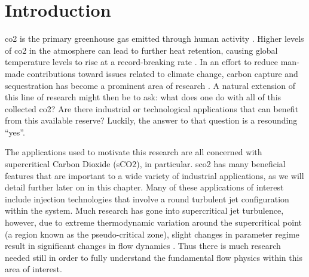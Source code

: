 \chapter{Introduction}

\gls{co2} is the primary greenhouse gas emitted through human activity \cite{Emissions_2023}. Higher levels of \gls{co2} in the atmosphere can lead to further heat retention, causing global temperature levels to rise at a record-breaking rate \cite{Lindsey_2023,}. In an effort to reduce man-made contributions toward issues related to climate change, carbon capture and sequestration has become a prominent area of research \cite{}. A natural extension of this line of research might then be to ask: what does one do with all of this collected \gls{co2}? Are there industrial or technological applications that can benefit from this available reserve? Luckily, the answer to that question is a resounding ``yes''.


The applications used to motivate this research are all concerned with supercritical Carbon Dioxide (sCO2), in particular. \gls{sco2} has many beneficial features that are important to a wide variety of industrial applications, as we will detail further later on in this chapter. Many of these applications of interest include injection technologies that involve a round turbulent jet configuration within the system. Much research has gone into supercritical jet turbulence, however, due to extreme thermodynamic variation around the supercritical point (a region known as the pseudo-critical zone), slight changes in parameter regime result in significant changes in flow dynamics \cite{}. Thus there is much research needed still in order to fully understand the fundamental flow physics within this area of interest. 

